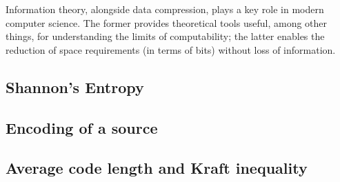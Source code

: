 \documentclass{subfiles}
\begin{document}
    Information theory, alongside data compression, 
        plays a key role in modern computer science. 
        The former provides theoretical tools useful, 
        among other things, for understanding the limits of computability; 
        the latter enables the reduction of space requirements 
        (in terms of bits) without loss of information.

    \subsection{Shannon's Entropy}\label{Sec:1.1}
    

    \subsection{Encoding of a source}
    

    \subsection{Average code length and Kraft inequality}
    
\end{document}
